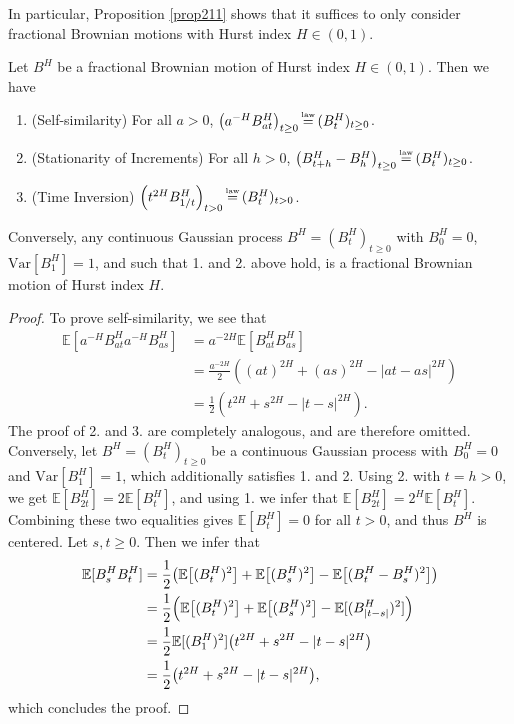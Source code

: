In particular, Proposition \ref{prop211} shows that it suffices to only consider fractional Brownian motions with Hurst index $H\in (0,1)$.
 \begin{prop}\label{prop212}
     Let $B^{H}$ be a fractional Brownian motion of Hurst index $H\in (0,1)$. Then we have
     \begin{enumerate}
         \item (Self-similarity) For all $a>0$, $\left(a^{-H}B^{H}_{at}\right)_{t\geq 0}\mylaw(B_{t}^{H})_{t\geq 0}$.
         \item (Stationarity of Increments) For all $h>0$, $\left(B_{t+h}^{H}-B_{h}^{H}\right)_{t\geq 0}\mylaw (B_{t}^{H})_{t\geq 0}$.
         \item (Time Inversion) $\left(t^{2H}B^{H}_{1/t}\right)_{t>0}\mylaw (B_{t}^{H})_{t>0}$.
     \end{enumerate}
     Conversely, any continuous Gaussian process $B^{H}=(B_{t}^{H})_{t\geq 0}$ with $B_{0}^{H}=0$, $\textrm{Var}[B_{1}^{H}]=1$, and such that 1. and 2. above hold, is a fractional Brownian motion of Hurst index $H$.
 \end{prop}
 \begin{proof}
 To prove self-similarity, we see that
     \begin{align}
         \mathbb{E}\left[a^{-H}B_{at}^{H}a^{-H}B_{as}^{H}\right]&=a^{-2H}\mathbb{E}[B_{at}^{H}B_{as}^{H}]\\
         &=\frac{a^{-2H}}{2}\left((at)^{2H}+(as)^{2H}-|at-as|^{2H}\right)\\
         &= \frac{1}{2}(t^{2H}+s^{2H}-|t-s|^{2H}).
     \end{align}
     The proof of 2. and 3. are completely analogous, and are therefore omitted. Conversely, let $B^{H}=(B_{t}^{H})_{t\geq 0}$ be a continuous Gaussian process with $B^{H}_{0}=0$ and $\textrm{Var}[B_{1}^{H}]=1$, which additionally satisfies 1. and 2. Using 2. with $t=h>0$, we get $\mathbb{E}[B_{2t}^{H}]=2\mathbb{E}[B_{t}^{H}]$, and using 1. we infer that $\mathbb{E}[B_{2t}^{H}]=2^{H}\mathbb{E}[B_{t}^{H}]$. Combining these two equalities gives $\mathbb{E}[B_{t}^{H}]=0$ for all $t>0$, and thus $B^{H}$ is centered. Let $s,t\geq 0$. Then we infer that
     \begin{align}
         \E[B_{s}^{H}B_{t}^{H}]&=\frac{1}{2}\left(\E\left[(B_{t}^{H})^{2}\right]+\E\left[(B_{s}^{H})^{2}\right]-\E\left[(B_{t}^{H}-B_{s}^{H})^{2}\right]\right)\\
         &= \frac{1}{2}\left(\E\left[(B_{t}^{H})^{2}\right]+\E\left[(B_{s}^{H})^{2}\right]-\E[(B_{|t-s|}^{H})^{2}]\right)\\
         &= \frac{1}{2}\E[(B_{1}^{H})^{2}]\left(t^{2H}+s^{2H}-|t-s|^{2H}\right)\\
         &= \frac{1}{2}\left(t^{2H}+s^{2H}-|t-s|^{2H}\right),
     \end{align}
     which concludes the proof.
 \end{proof}
